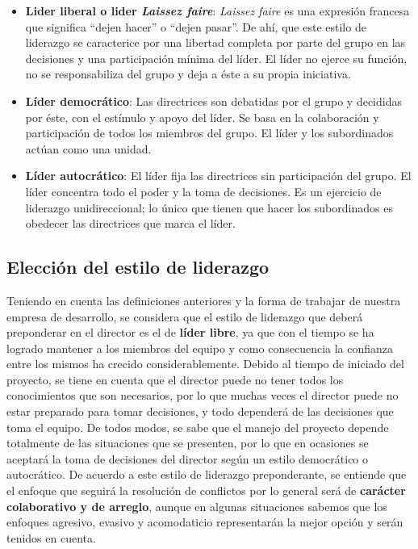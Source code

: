 \begin{itemize}
\item\textbf{Lider liberal o lider \textit{Laissez faire}}:
\textit{Laissez faire} es una expresión francesa que significa ``dejen hacer'' o ``dejen pasar''.
De ahí, que este estilo de liderazgo se caracterice por una libertad completa por parte del grupo en las decisiones y una participación mínima del líder.
El líder no ejerce su función, no se responsabiliza del grupo y deja a éste a su propia iniciativa.

\item\textbf{Líder democrático}:
Las directrices son debatidas por el grupo y decididas por éste, con el estímulo y apoyo del líder.
Se basa en la colaboración y participación de todos los miembros del grupo.
El líder y los subordinados actúan como una unidad.

\item\textbf{Líder autocrático}:
El líder fija las directrices sin participación del grupo.
El líder concentra todo el poder y la toma de decisiones.
Es un ejercicio de liderazgo unidireccional; lo único que tienen que hacer los subordinados es obedecer las directrices que marca el líder.
\end{itemize}

\subsection{Elección del estilo de liderazgo}

Teniendo en cuenta las definiciones anteriores y la forma de trabajar de nuestra empresa de desarrollo, se considera que el estilo de liderazgo que deberá preponderar en el director es el de \textbf{líder libre}, ya que con el tiempo se ha logrado mantener a los miembros del equipo y como consecuencia la confianza entre los mismos ha crecido considerablemente.
Debido al tiempo de iniciado del proyecto, se tiene en cuenta que el director puede no tener todos los conocimientos que son necesarios, por lo que muchas veces el director puede no estar preparado para tomar decisiones, y todo dependerá de las decisiones que toma el equipo.
De todos modos, se sabe que el manejo del proyecto depende totalmente de las situaciones que se presenten, por lo que en ocasiones se aceptará la toma de decisiones del director según un estilo democrático o autocrático.
De acuerdo a este estilo de liderazgo preponderante, se entiende que el enfoque que seguirá la resolución de conflictos por lo general será de \textbf{carácter colaborativo y de arreglo}, aunque en algunas situaciones sabemos que los enfoques agresivo, evasivo y acomodaticio representarán la mejor opción y serán tenidos en cuenta. 


